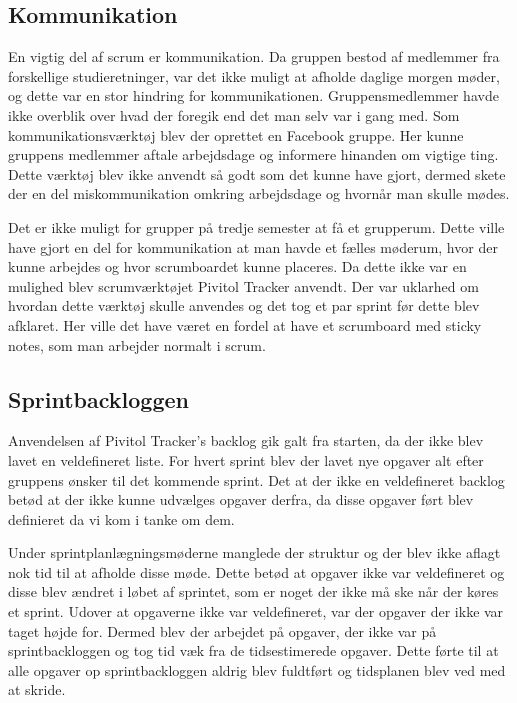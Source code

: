 	\subsection{Kommunikation}
	En vigtig del af scrum er kommunikation. Da gruppen bestod af medlemmer fra forskellige studieretninger, var det ikke muligt at afholde daglige morgen møder, og dette var en stor hindring for kommunikationen. Gruppensmedlemmer havde ikke overblik over hvad der foregik end det man selv var i gang med. Som kommunikationsværktøj blev der oprettet en Facebook gruppe. Her kunne gruppens medlemmer aftale arbejdsdage og informere hinanden om vigtige ting. Dette værktøj blev ikke anvendt så godt som det kunne have gjort, dermed skete der en del miskommunikation omkring arbejdsdage og hvornår man skulle mødes. \par
	Det er ikke muligt for grupper på tredje semester at få et grupperum. Dette ville have gjort en del for kommunikation at man havde et fælles møderum, hvor der kunne arbejdes og hvor scrumboardet kunne placeres. Da dette ikke var en mulighed blev scrumværktøjet Pivitol Tracker anvendt. Der var uklarhed om hvordan dette værktøj skulle anvendes og det tog et par sprint før dette blev afklaret. Her ville det have været en fordel at have et scrumboard med sticky notes, som man arbejder normalt i scrum. 
	
	\subsection{Sprintbackloggen}
	Anvendelsen af Pivitol Tracker's backlog gik galt fra starten, da der ikke blev lavet en veldefineret liste. For hvert sprint blev der lavet nye opgaver alt efter gruppens ønsker til det kommende sprint. Det at der ikke en veldefineret backlog betød at der ikke kunne udvælges opgaver derfra, da disse opgaver ført blev definieret da vi kom i tanke om dem. \par
	Under sprintplanlægningsmøderne manglede der struktur og der blev ikke aflagt nok tid til at afholde disse møde. Dette betød at opgaver ikke var veldefineret og disse blev ændret i løbet af sprintet, som er noget der ikke må ske når der køres et sprint. Udover at opgaverne ikke var veldefineret, var der opgaver der ikke var taget højde for. Dermed blev der arbejdet på opgaver, der ikke var på sprintbackloggen og tog tid væk fra de tidsestimerede opgaver. Dette førte til at alle opgaver op sprintbackloggen aldrig blev fuldtført og tidsplanen blev ved med at skride.  

